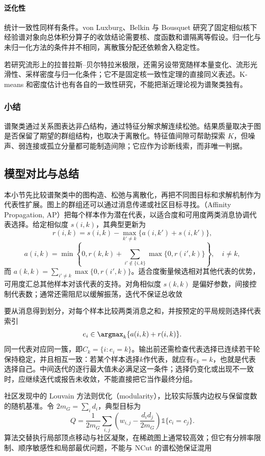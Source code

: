 \paragraph{泛化性}
统计一致性同样有条件。von Luxburg、Belkin 与 Bousquet 研究了固定相似核下经验谱对象向总体积分算子的收敛结论需要核、度函数和谱隔离等假设。归一化与未归一化方法的条件并不相同，离散簇分配还依赖舍入稳定性。

若研究流形上的拉普拉斯--贝尔特拉米极限，还需另设带宽随样本量变化、流形光滑性、采样密度与归一化条件；它不是固定核一致性定理的直接同义表述。K-means 和密度估计也有各自的一致性研究，不能把渐近理论视为谱聚类独有。

\subsubsection{小结}

谱聚类通过关系图表达非凸结构，通过特征分解求解连续松弛。结果质量取决于图是否保留了期望的群组结构，也取决于离散化。特征值间隙可帮助探索 $K$，但噪声、弱连接或孤立分量都可能制造间隙；它应作为诊断线索，而非唯一判据。

\subsection{模型对比与总结}

本小节先比较谱聚类中的图构造、松弛与离散化，再把不同图目标和求解机制作为代表性扩展。图上的群组还可以通过消息传递或社区目标寻找。（Affinity Propagation, AP）把每个样本作为潜在代表，以适合度和可用度两类消息协调代表选择。给定相似度 $s(i,k)$，其典型更新为
\[
 r(i,k)=s(i,k)-\max_{k'\ne k}\{a(i,k')+s(i,k')\},
\]
\[
 a(i,k)=
 \min\left\{0,r(k,k)+
 \sum_{i'\notin\{i,k\}}\max\{0,r(i',k)\}\right\},
 \quad i\ne k,
\]
而 $a(k,k)=\sum_{i'\ne k}\max\{0,r(i',k)\}$。适合度衡量候选相对其他代表的优势，可用度汇总其他样本对该代表的支持。对角相似度 $s(k,k)$ 是偏好参数，间接控制代表数；通常还需阻尼以缓解振荡，迭代不保证总收敛

要从消息得到划分，对每个样本比较两类消息之和，并按预定的平局规则选择代表索引
\[
 e_i\in\argmax_k\{a(i,k)+r(i,k)\}.
\]
同一代表对应同一簇，即$C_k=\{i:e_i=k\}$。输出前还需检查代表选择已连续若干轮保持稳定，并且相互一致：若某个样本选择$k$作代表，就应有$e_k=k$，也就是代表选择自己。中间迭代的逐行最大值未必满足这一条件；选择仍变化或出现不一致时，应继续迭代或报告未收敛，不能直接把它当作最终分组。

社区发现中的 Louvain 方法则优化（modularity），比较实际簇内边权与保留度数的随机基准。令 $2m_G=\sum_i d_i$，典型目标为
\[
 Q=\frac{1}{2m_G}\sum_{i,j}
 \left(w_{i,j}-\frac{d_i d_j}{2m_G}\right)
 \mathbb{1}\{c_i=c_j\}.
\]
算法交替执行局部顶点移动与社区凝聚，在稀疏图上通常较高效；但它有分辨率限制、顺序敏感性和局部最优问题，不能与 NCut 的谱松弛保证混用

